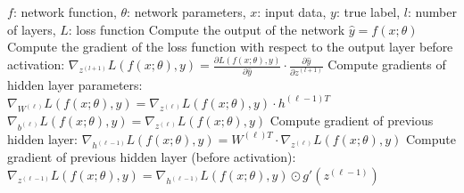 \begin{algorithm}[htb!]
\caption{Gradient of the Loss Function \cite{goodfellow_deep_2016}.}
\label{Codes:GradientLossFunction}
\begin{algorithmic}
\REQUIRE \( f \): network function, \( \theta \): network parameters, \( x \): input data, \( y \): true label, \( l \): number of layers, \( L \): loss function
\STATE Compute the output of the network \( \hat{y} = f(x; \theta) \)
\STATE Compute the gradient of the loss function with respect to the output layer before activation:
\STATE \( \nabla_{z^{(l+1)}}L(f(x; \theta), y) = \frac{\partial L(f(x; \theta), y)}{\partial \hat{y}} \cdot \frac{\partial \hat{y}}{\partial z^{(l+1)}} \)
\STATE Compute gradients of hidden layer parameters:
\STATE \( \nabla_{W^{(\ell)}}L(f(x; \theta), y) = \nabla_{z^{(\ell)}}L(f(x; \theta), y) \cdot h^{(\ell-1)T} \)
\STATE \( \nabla_{b^{(\ell)}}L(f(x; \theta), y) = \nabla_{z^{(\ell)}}L(f(x; \theta), y) \)
\STATE Compute gradient of previous hidden layer:
\STATE \( \nabla_{h^{(\ell-1)}}L(f(x; \theta), y) = W^{(\ell)T} \cdot \nabla_{z^{(\ell)}}L(f(x; \theta), y) \)
\STATE Compute gradient of previous hidden layer (before activation):
\STATE \( \nabla_{z^{(\ell-1)}}L(f(x; \theta), y) = \nabla_{h^{(\ell-1)}}L(f(x; \theta), y) \odot g'(z^{(\ell-1)}) \)
\ENDFOR
\end{algorithmic}
\end{algorithm}